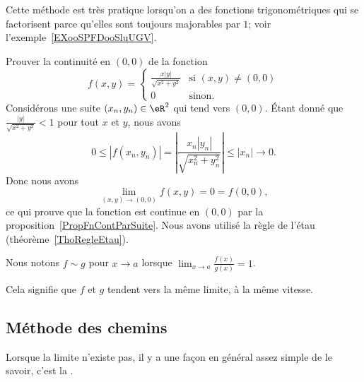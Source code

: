 Cette méthode est très pratique lorsqu'on a des fonctions trigonométriques qui se factorisent parce qu'elles sont toujours majorables par $1$; voir l'exemple~\ref{EXooSPFDooSluUGV}.

\begin{example}
	Prouver la continuité en $(0,0)$ de la fonction
	\begin{equation}
		f(x,y)=\begin{cases}
			\frac{ x | y | }{ \sqrt{x^2+y^2} }	&	\text{si }(x,y)\neq (0,0)\\
			0	&	 \text{sinon.}
		\end{cases}
	\end{equation}
	Considérons une suite $(x_n,y_n)\in\eR^2$ qui tend vers $(0,0)$. Étant donné que $\frac{ | y | }{ \sqrt{x^2+y^2} }<1$ pour tout $x$ et $y$, nous avons
	\begin{equation}
		0\leq | f(x_n,y_n) |=\left| \frac{ x_n | y_n | }{ \sqrt{x_n^2+y_n^2} } \right| \leq | x_n |\to 0.
	\end{equation}
	Donc nous avons
	\begin{equation}
		\lim_{(x,y)\to(0,0)}f(x,y)=0=f(0,0),
	\end{equation}
	ce qui prouve que la fonction est continue en $(0,0)$ par la proposition~\ref{PropFnContParSuite}. Nous avons utilisé la règle de l'étau (théorème~\ref{ThoRegleEtau}).
\end{example}

\begin{normaltext}
    Nous notons \( f\sim g\) pour \( x\to a\) lorsque \( \lim_{x\to a} \frac{ f(x) }{ g(x) }=1\).

    Cela signifie que \( f\) et \( g\) tendent vers la même limite, à la même vitesse.
\end{normaltext}

\subsection{Méthode des chemins}

Lorsque la limite n'existe pas, il y a une façon en général assez simple de le savoir, c'est la .

